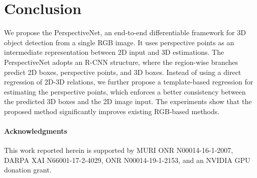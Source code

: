 \documentclass{article}
\begin{document}
\section{Conclusion}

We propose the PerspectiveNet, an end-to-end differentiable framework for 3D object detection from a single RGB image. It uses perspective points as an intermediate representation between 2D input and 3D estimations. The PerspectiveNet adopts an R-CNN structure, where the region-wise branches predict 2D boxes, perspective points, and 3D boxes. Instead of using a direct regression of 2D-3D relations, we further propose a template-based regression for estimating the perspective points, which enforces a better consistency between the predicted 3D boxes and the 2D image input. The experiments show that the proposed method significantly improves existing RGB-based methods.

\paragraph{Acknowledgments}

This work reported herein is supported by MURI ONR N00014-16-1-2007, DARPA XAI N66001-17-2-4029, ONR N00014-19-1-2153, and an NVIDIA GPU donation grant.

\newpage
{}

\setlength{\bibsep}{4pt}

\end{document}
